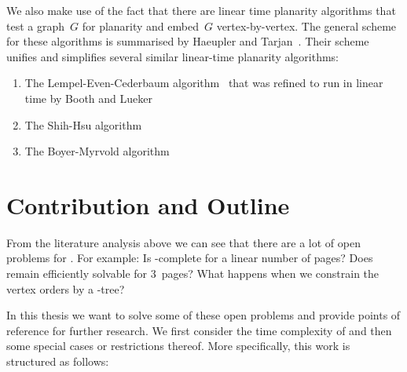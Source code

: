 We also make use of the fact that there are linear time planarity algorithms that test a graph~$G$
for planarity and embed~$G$ vertex-by-vertex.
The general scheme for these algorithms is summarised by Haeupler and Tarjan~\cite{Haeupler08}. 
Their scheme unifies and simplifies several similar linear-time planarity algorithms:
\begin{enumerate} 
\item The Lempel-Even-Cederbaum algorithm~\cite{Lempel67} that was refined
to run in linear time by Booth and Lueker~\cite{Booth76}
\item The Shih-Hsu algorithm~\cite{Shih93}
\item The Boyer-Myrvold algorithm~\cite{Boyer99}
\end{enumerate}

\section{Contribution and Outline}
\label{section:contrib}

From the literature analysis above we can see that there are a lot of open problems
for \probBook. For example: Is \probBook \NP-complete for a linear number
of pages? Does \probBook remain efficiently solvable for 3~pages? What happens when we constrain
the vertex orders by a \PQ-tree?

In this thesis we want to solve some of these open problems and provide points of reference for further
research. We first consider the time complexity of \probBook and then some special cases or restrictions thereof. More specifically, this work is structured as follows:

